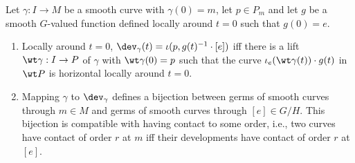 \begin{thm}
    Let $\gamma:I\to M$ be a smooth curve with $\gamma(0)=m$, let $p\in P_m$ and let $g$ be a smooth $G$-valued function defined locally around $t=0$ such that $g(0)=e$.
    \begin{enumerate}[label=(\arabic*)]
        \item Locally around $t=0$, $\dev_\gamma(t)=\iota(p,g(t)^{-1}\cdot [e])$ iff there is a lift $\wt\gamma:I\to P$ of $\gamma$ with $\wt\gamma(0)=p$ such that the curve $\iota_e(\wt\gamma(t))\cdot g(t)$ in $\wt P$ is horizontal locally around $t=0$.
        \item Mapping $\gamma$ to $\dev_\gamma$ defines a bijection between germs of smooth curves through $m\in M$ and germs of smooth curves through $[e]\in G\slash H$. This bijection is compatible with having contact to some order, i.e., two curves have contact of order $r$ at $m$ iff their developments have contact of order $r$ at $[e]$.
    \end{enumerate}
\end{thm}

